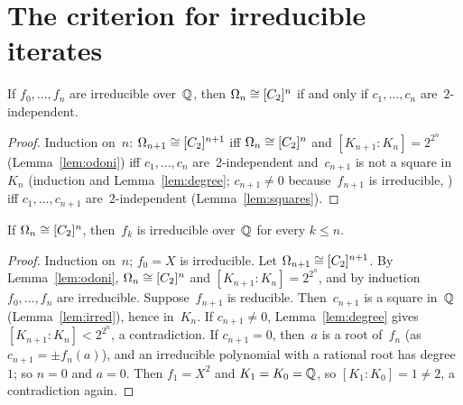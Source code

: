 \section{The criterion for irreducible iterates}

\begin{lemma}
  \label{lem:criterion-irr}
  \leanok
  If $f_0, \dots, f_n$ are irreducible over~$\mathbb{Q}$, then $\Omega_n \cong [C_2]^{n}$ if and only if
  $c_1, \dots, c_n$ are~$2$-independent.
\end{lemma}
\begin{proof}
  \leanok
  Induction on~$n$: $\Omega_{n+1} \cong [C_2]^{n+1}$ iff $\Omega_n \cong [C_2]^{n}$ and
  $[K_{n+1} : K_n] = 2^{2^n}$ (Lemma~\ref{lem:odoni}) iff $c_1, \dots, c_n$ are~$2$-independent
  and~$c_{n+1}$ is not a square in~$K_n$ (induction and Lemma~\ref{lem:degree}; $c_{n+1} \ne 0$
  because~$f_{n+1}$ is irreducible, ) iff
  $c_1, \dots, c_{n+1}$ are~$2$-independent (Lemma~\ref{lem:squares}).
\end{proof}

\begin{lemma}
  \label{lem:irred-of-iso}
  \leanok
  If $\Omega_n \cong [C_2]^{n}$, then~$f_k$ is irreducible over~$\mathbb{Q}$ for every $k \le n$.
\end{lemma}
\begin{proof}
  \leanok
  Induction on~$n$; $f_0 = X$ is irreducible. Let $\Omega_{n+1} \cong [C_2]^{n+1}$. By
  Lemma~\ref{lem:odoni}, $\Omega_n \cong [C_2]^{n}$ and $[K_{n+1} : K_n] = 2^{2^n}$, and by induction
  $f_0, \dots, f_n$ are irreducible. Suppose~$f_{n+1}$ is reducible. Then~$c_{n+1}$ is a square
  in~$\mathbb{Q}$ (Lemma~\ref{lem:irred}), hence in~$K_n$. If $c_{n+1} \ne 0$, Lemma~\ref{lem:degree}
  gives $[K_{n+1} : K_n] < 2^{2^n}$, a contradiction. If $c_{n+1} = 0$, then~$a$ is a root
  of~$f_n$ (as $c_{n+1} = \pm f_n(a)$), and an irreducible polynomial with a rational root has
  degree~$1$; so $n = 0$ and $a = 0$. Then $f_1 = X^2$ and $K_1 = K_0 = \mathbb{Q}$, so
  $[K_1 : K_0] = 1 \ne 2$, a contradiction again.
\end{proof}
